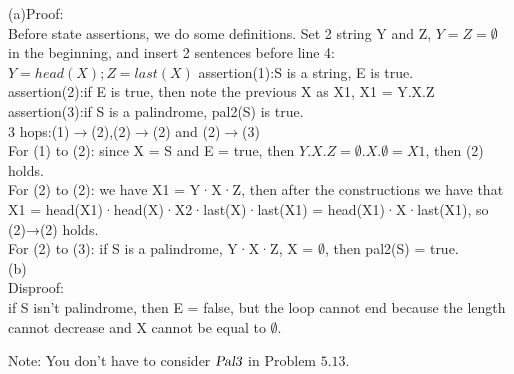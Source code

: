 \documentclass[a4paper, justified]{tufte-handout}
\begin{document}
\begin{solution}
  (a)Proof:\\
  Before state assertions, we do some definitions. Set 2 string Y and Z, $Y = Z = \emptyset$ in the beginning, and insert 2 sentences before line 4: $Y = head(X); Z = last(X)$
  assertion(1):S is a string, E is true.\\
  assertion(2):if E is true, then note the previous X as X1, X1 = Y.X.Z\\
  assertion(3):if S is a palindrome, pal2(S) is true.\\
  3 hops:(1)$\rightarrow$(2),(2)$\rightarrow$(2) and (2)$\rightarrow$(3)\\
  For (1) to (2): since X = S and E = true, then $Y.X.Z = \emptyset . X. \emptyset = X1$, then (2) holds.\\
  For (2) to (2): we have X1 = Y·X·Z, then after the constructions we have that X1 = head(X1)·head(X)·X2·last(X)·last(X1) = head(X1)·X·last(X1), so (2)→(2) holds.\\
  For (2) to (3): if S is a palindrome, Y·X·Z, X = $\emptyset$, then pal2(S) = true.\\
  (b)\\
  Disproof:\\
  if S isn’t palindrome, then E = false, but the loop cannot end because the length cannot decrease and X cannot be equal to $\emptyset$.

\end{solution}

\begin{problem}
Note: You don't have to consider $\textsl{Pal3}$ in Problem $5.13$.
\end{problem}
\end{document}
